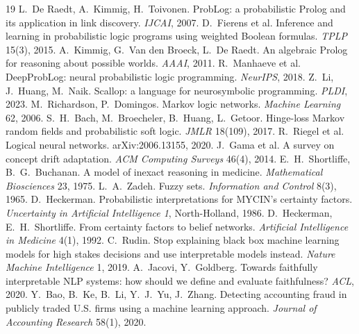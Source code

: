 \documentclass[10pt]{article}
\begin{document}
\begin{thebibliography}{19}
\small
{} L.~De Raedt, A.~Kimmig, H.~Toivonen.
ProbLog: a probabilistic Prolog and its application in link discovery.
\emph{IJCAI}, 2007.
 D.~Fierens et al.
Inference and learning in probabilistic logic programs using weighted
Boolean formulas. \emph{TPLP} 15(3), 2015.
 A.~Kimmig, G.~Van den Broeck, L.~De Raedt.
An algebraic Prolog for reasoning about possible worlds. \emph{AAAI}, 2011.
 R.~Manhaeve et al.
DeepProbLog: neural probabilistic logic programming. \emph{NeurIPS}, 2018.
 Z.~Li, J.~Huang, M.~Naik.
Scallop: a language for neurosymbolic programming. \emph{PLDI}, 2023.
 M.~Richardson, P.~Domingos.
Markov logic networks. \emph{Machine Learning} 62, 2006.
 S.~H.~Bach, M.~Broecheler, B.~Huang, L.~Getoor.
Hinge-loss Markov random fields and probabilistic soft logic.
\emph{JMLR} 18(109), 2017.
 R.~Riegel et al. Logical neural networks.
arXiv:2006.13155, 2020.
 J.~Gama et al. A survey on concept drift adaptation.
\emph{ACM Computing Surveys} 46(4), 2014.
 E.~H.~Shortliffe, B.~G.~Buchanan.
A model of inexact reasoning in medicine.
\emph{Mathematical Biosciences} 23, 1975.
 L.~A.~Zadeh. Fuzzy sets.
\emph{Information and Control} 8(3), 1965.
 D.~Heckerman.
Probabilistic interpretations for MYCIN's certainty factors.
\emph{Uncertainty in Artificial Intelligence 1}, North-Holland, 1986.
 D.~Heckerman, E.~H.~Shortliffe.
From certainty factors to belief networks.
\emph{Artificial Intelligence in Medicine} 4(1), 1992.
 C.~Rudin.
Stop explaining black box machine learning models for high stakes
decisions and use interpretable models instead.
\emph{Nature Machine Intelligence} 1, 2019.
 A.~Jacovi, Y.~Goldberg.
Towards faithfully interpretable NLP systems: how should we define and
evaluate faithfulness? \emph{ACL}, 2020.
 Y.~Bao, B.~Ke, B.~Li, Y.~J.~Yu, J.~Zhang.
Detecting accounting fraud in publicly traded U.S. firms using a
machine learning approach. \emph{Journal of Accounting Research} 58(1),
2020.
\end{thebibliography}
\end{document}
